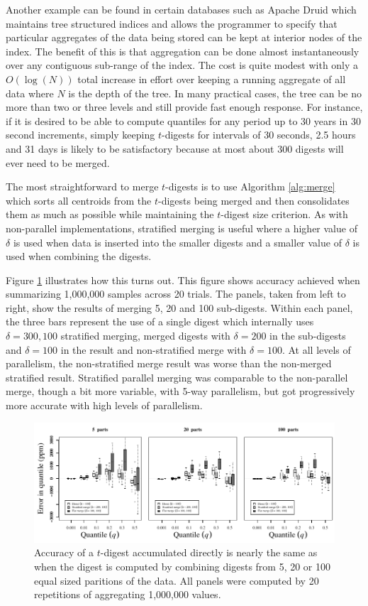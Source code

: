 \documentclass[]{statsoc}
\begin{document}
Another example can be found in certain databases such as Apache Druid which maintains tree structured indices and allows the programmer to specify that particular aggregates of the data being stored can be kept at interior nodes of the index.  The benefit of this is that aggregation can be done almost instantaneously over any contiguous sub-range of the index.  The cost is quite modest with only a $O(\log(N))$ total increase in effort over keeping a running aggregate of all data where $N$ is the depth of the tree.  In many practical cases, the tree can be no more than two or three levels and still provide fast enough response.  For instance, if it is desired to be able to compute quantiles for any period up to 30 years in 30 second increments, simply keeping $t$-digests for intervals of 30 seconds, 2.5 hours and 31 days is likely to be satisfactory because at most about 300 digests will ever need to be merged.  

The most straightforward to merge $t$-digests is to use Algorithm \ref{alg:merge} which sorts all centroids from the $t$-digests being merged and then consolidates them as much as possible while maintaining the $t$-digest size criterion. As with non-parallel implementations, stratified merging is useful where a higher value of $\delta$ is used when data is inserted into the smaller digests and a smaller value of $\delta$ is used when combining the digests. 

Figure \ref{fig:merge} illustrates how this turns out. This figure shows accuracy achieved when summarizing 1,000,000 samples across 20 trials. The panels, taken from left to right, show the results of merging 5, 20 and 100 sub-digests. Within each panel, the three bars represent the use of a single digest which internally uses $\delta=300,100$ stratified merging, merged digests with $\delta=200$ in the sub-digests and $\delta=100$ in the result and non-stratified merge with $\delta=100$. At all levels of parallelism, the non-stratified merge result was worse than the non-merged stratified result. Stratified parallel merging was comparable to the non-parallel merge, though a bit more variable, with 5-way parallelism, but got progressively more accurate with high levels of parallelism.

\begin{figure}[htb] %
   \centering
   \includegraphics[width=5.5in]{figures/merge.pdf} 
   \caption{Accuracy of a $t$-digest accumulated directly is nearly the same as when the digest is computed by combining digests from 5, 20 or 100 equal sized paritions of the data.  All panels were computed by 20 repetitions of aggregating 1,000,000 values. }
   \label{fig:merge}
\end{figure}
\end{document}
